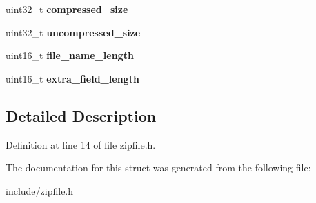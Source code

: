 \begin{DoxyCompactItemize}
\item 
\hypertarget{structZIPLocalFileHeader_a8587a429449ac7278400297de217b061}{uint32\-\_\-t {\bfseries compressed\-\_\-size}}\label{structZIPLocalFileHeader_a8587a429449ac7278400297de217b061}

\item 
\hypertarget{structZIPLocalFileHeader_a5e75763be2b5edd0c05794c7f639569f}{uint32\-\_\-t {\bfseries uncompressed\-\_\-size}}\label{structZIPLocalFileHeader_a5e75763be2b5edd0c05794c7f639569f}

\item 
\hypertarget{structZIPLocalFileHeader_ab765e8548e1950eec7267050a77da396}{uint16\-\_\-t {\bfseries file\-\_\-name\-\_\-length}}\label{structZIPLocalFileHeader_ab765e8548e1950eec7267050a77da396}

\item 
\hypertarget{structZIPLocalFileHeader_a7f3da781d758b61b2e2d9c50fd207a07}{uint16\-\_\-t {\bfseries extra\-\_\-field\-\_\-length}}\label{structZIPLocalFileHeader_a7f3da781d758b61b2e2d9c50fd207a07}

\end{DoxyCompactItemize}


\subsection{Detailed Description}


Definition at line 14 of file zipfile.\-h.



The documentation for this struct was generated from the following file\-:\begin{DoxyCompactItemize}
\item 
include/zipfile.\-h\end{DoxyCompactItemize}
